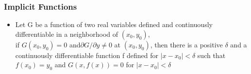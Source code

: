 \documentclass[notheorems,mathserif,table,compress]{beamer}  %
\begin{document}
\begin{frame}
  \frametitle{Implicit Functions}
  \begin{itemize}
\item Let G be a function of two real variables defined and continuously differentiable  in a neighborhood of $(x_0,y_0)$, \\
if $G(x_0,y_0)=0$ and$\partial G/\partial y\neq 0$ at $(x_0,y_0)$, then there is a positive $\delta$ and a continuously  differentiable function f defined  for $|x-x_0|<\delta$ such that $f(x_0)=y_0$ and  $G(x,f(x))=0$ for $|x-x_0|<\delta$ 


\end{itemize}
\end{frame}
\end{document}
